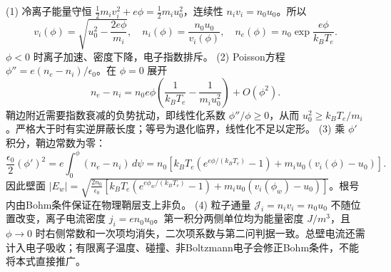(1) 冷离子能量守恒 \(\frac12m_iv_i^2+e\phi=\frac12m_iu_0^2\)，连续性 \(n_iv_i=n_0u_0\)。所以
\[
v_i(\phi)=\sqrt{u_0^2-\frac{2e\phi}{m_i}},\quad
n_i(\phi)=\frac{n_0u_0}{v_i(\phi)},\quad
n_e(\phi)=n_0\exp\frac{e\phi}{k_BT_e}.
\]
\(\phi<0\) 时离子加速、密度下降，电子指数排斥。
(2) Poisson方程 \(\phi''=e(n_e-n_i)/\epsilon_0\)。在 \(\phi=0\) 展开
\[
n_e-n_i=n_0e\phi\left(\frac1{k_BT_e}-\frac1{m_iu_0^2}\right)+O(\phi^2).
\]
鞘边附近需要指数衰减的负势扰动，即线性化系数 \(\phi''/\phi\ge0\)，从而 \(u_0^2\ge k_BT_e/m_i\)。严格大于时有实逆屏蔽长度；等号为退化临界，线性化不足以定形。
(3) 乘 \(\phi'\) 积分，鞘边常数为零：
\[
\frac{\epsilon_0}{2}(\phi')^2=e\int_0^\phi(n_e-n_i)\,d\psi
=n_0\!\left[k_BT_e\left(e^{e\phi/(k_BT_e)}-1\right)+m_iu_0\left(v_i(\phi)-u_0\right)\right].
\]
因此壁面 \(|E_w|=\sqrt{\frac{2n_0}{\epsilon_0}[k_BT_e(e^{e\phi_w/(k_BT_e)}-1)+m_iu_0(v_i(\phi_w)-u_0)]}\)。根号内由Bohm条件保证在物理鞘层支上非负。
(4) 粒子通量 \(\mathcal J_i=n_iv_i=n_0u_0\) 不随位置改变，离子电流密度 \(j_i=en_0u_0\)。第一积分两侧单位均为能量密度 \(J/m^3\)，且 \(\phi\to0\) 时右侧常数和一次项均消失，二次项系数与第二问判据一致。总壁电流还需计入电子吸收；有限离子温度、碰撞、非Boltzmann电子会修正Bohm条件，不能将本式直接推广。
